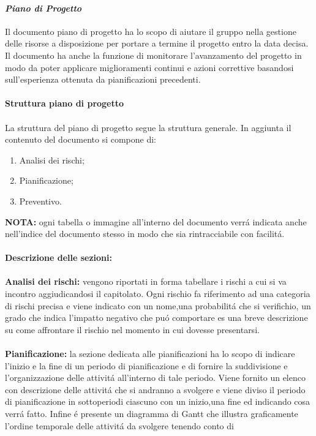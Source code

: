 \paragraph{\textit{Piano di Progetto}}

Il documento piano di progetto ha lo scopo di aiutare il gruppo nella gestione delle risorse a disposizione per portare a termine il progetto entro la data decisa.
Il documento ha anche la funzione di monitorare l'avanzamento del progetto in modo da poter applicare miglioramenti continui e azioni correttive
basandosi sull'esperienza ottenuta da pianificazioni precedenti.
\\\\
\textbf{Struttura piano di progetto}
\\\\
La struttura del piano di progetto segue la struttura generale.
In aggiunta il contenuto del documento si compone di:
\begin{enumerate}
    \item Analisi dei rischi;
    \item Pianificazione;
    \item Preventivo.
\end{enumerate}
\textbf{NOTA:} ogni tabella o immagine all'interno del documento verrá indicata anche nell'indice del documento stesso in modo che sia rintracciabile con 
facilitá.
\\\\
\textbf{Descrizione delle sezioni:}
\\\\
\textbf{Analisi dei rischi:} vengono riportati in forma tabellare i rischi a cui si va incontro aggiudicandosi il capitolato.
Ogni rischio fa riferimento ad una categoria di rischi precisa e viene indicato con un nome,una probabilitá che si verifichio,
un grado che indica l'impatto negativo che puó
comportare es una breve descrizione su come affrontare il rischio nel momento in cui dovesse presentarsi.
\\\\
\textbf{Pianificazione:} la sezione dedicata alle pianificazioni ha lo scopo di indicare l'inizio e la fine di un periodo di pianificazione e 
di fornire la suddivisione e l'organizzazione delle attivitá all'interno di tale periodo.
Viene fornito un elenco con descrizione delle attivitá che si andranno a svolgere e viene diviso il periodo di pianificazione in sottoperiodi 
ciascuno con un inizio,una fine ed indicando cosa verrá fatto.
Infine é presente un diagramma di Gantt che illustra graficamente l'ordine temporale delle attivitá da svolgere tenendo conto di 
